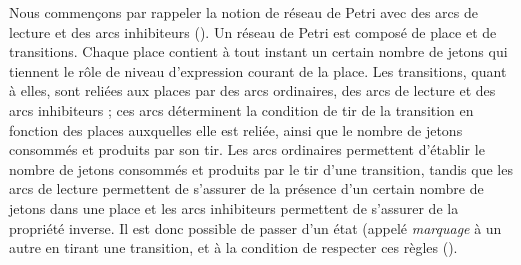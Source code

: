 \myskip

Nous commençons par rappeler la notion de réseau de Petri avec des arcs de lecture
et des arcs inhibiteurs ().
Un réseau de Petri est composé de place et de transitions.
Chaque place contient à tout instant un certain nombre de jetons qui tiennent le rôle
de niveau d'expression courant de la place.
Les transitions, quant à elles, sont reliées aux places par des arcs ordinaires,
des arcs de lecture et des arcs inhibiteurs ;
ces arcs déterminent la condition de tir de la transition en fonction des places auxquelles
elle est reliée, ainsi que le nombre de jetons consommés et produits par son tir.
Les arcs ordinaires permettent d'établir le nombre de jetons consommés
et produits par le tir d'une transition, tandis que
les arcs de lecture permettent de s'assurer de la présence d'un certain nombre de jetons
dans une place et les arcs inhibiteurs permettent de s'assurer de la propriété
inverse.
Il est donc possible de passer d'un état (appelé \emph{marquage} à un autre
en tirant une transition, et à la condition de respecter ces règles ().

